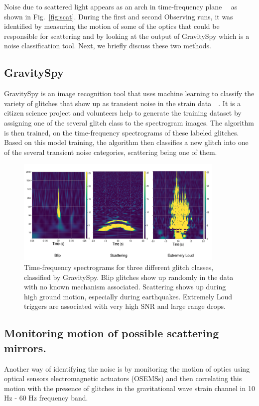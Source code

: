 \documentclass[12pt]{iopart}
\begin{document}
Noise due to scattered light appears as an arch in time-frequency plane~\cite{omegscan}~\cite{omegscan1} as shown in  Fig.~\ref{fig:scat}. During the first and second Observing runs, it was identified by measuring the motion of some of the optics that could be responsible for scattering and by looking at the output of GravitySpy which is a noise classification tool. Next, we briefly discuss these two methods.


\subsection{GravitySpy}
GravitySpy is an image recognition tool that uses machine learning to classify the variety of glitches that show up as transient noise in the strain data~\cite{gspy}~\cite{gspymachine}. It is a citizen science project and volunteers help to generate the training dataset by assigning one of the several glitch class to the spectrogram images. The algorithm is then trained, on the time-frequency spectrograms of these labeled glitches. Based on this model training, the algorithm then classifies a new glitch into one of the several transient noise categories, scattering being one of them.

\begin{figure}[h]
    \centering
    \includegraphics[width=10cm]{gspyglitch1.png}
    \caption{Time-frequency spectrograms for three different glitch classes, classified by GravitySpy. Blip glitches show up randomly in the data with no known mechanism associated. Scattering shows up during high ground motion, especially during earthquakes. Extremely Loud triggers are associated with very high SNR and large range drops. }
    \label{fig:gspyimages}
\end{figure}



\subsection{Monitoring motion of possible scattering mirrors.}\label{osems}
Another way of identifying the noise is by monitoring the motion of optics using optical sensors electromagnetic actuators (OSEMSs) and then correlating this motion with the presence of glitches in the gravitational wave strain channel in 10 Hz - 60 Hz frequency band.
\end{document}
